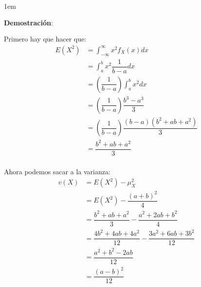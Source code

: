 \documentclass[12pt, fleqn]{report}                             %
\newenvironment{SmallIndentation}[1][0.75em]                    %
        {\begin{adjustwidth}{#1}{}\begin{footnotesize}}             %
        {\end{footnotesize}\end{adjustwidth}}                       %
\theoremstyle{break}                                            %
\newcommand{\Wrap}[1]           {\left( #1 \right)}             %
\newcommand{\pfrac}[2]      {\Wrap{\dfrac{#1}{#2}}}             %
\begin{document}
                \begin{SmallIndentation}[1em]
                    \textbf{Demostración}:
                    
                    Primero hay que hacer que:
                    \begin{align*}
                        E(X^2) 
                            &= \int_{-\infty}^\infty x^2 f_X (x) dx                 \\
                            &= \int_a^b x^2 \dfrac{1}{b-a} dx                       \\
                            &= \pfrac{1}{b-a} \int_a^b x^2 dx                       \\
                            &= \pfrac{1}{b-a} \dfrac{b^3 - a^3}{3}                  \\
                            &= \pfrac{1}{b-a} \dfrac{(b-a)(b^2 + ab + a^2)}{3}      \\
                            &= \dfrac{b^2 + ab + a^2}{3}                            \\
                    \end{align*}

                    Ahora podemos sacar a la varianza:
                    \begin{align*}
                        v(X)
                            &= E(X^2) -\mu_X^2                                              \\
                            &= E(X^2) -\dfrac{(a+b)^2}{4}                                   \\
                            &= \dfrac{b^2 + ab + a^2}{3} -\dfrac{a^2+ 2ab + b^2}{4}         \\
                            &= \dfrac{4b^2 + 4ab + 4a^2}{12} -\dfrac{3a^2+ 6ab + 3b^2}{12}  \\
                            &= \dfrac{a^2 + b^2 - 2ab}{12}                                  \\
                            &= \dfrac{(a-b)^2}{12} 
                    \end{align*}
                
                \end{SmallIndentation}
                    

                   

            \clearpage
\end{document}
